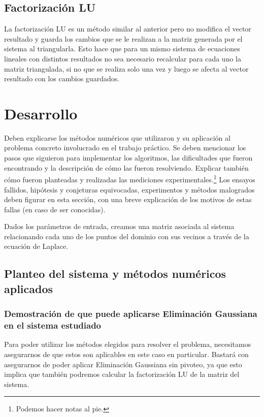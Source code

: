 \documentclass[11pt, a4paper, spanish]{article}
\theoremstyle{plain}
\theoremstyle{remark}
\begin{document}
    \subsection{Factorización LU}
      La factorización LU es un método similar al anterior pero no modifica el vector resultado y guarda los cambios que se le realizan a la matriz generada por el sistema al triangularla. Esto hace que para un mismo sistema de ecuaciones lineales con distintos resultados no sea necesario recalcular para cada uno la matriz triangulada, si  no que se realiza solo una vez y luego se afecta al vector resultado con los cambios guardados.


\section{Desarrollo}

  Deben explicarse los métodos numéricos que utilizaron y su aplicación al problema concreto involucrado en el trabajo práctico. Se deben mencionar los pasos que siguieron para implementar los algoritmos, las dificultades que fueron encontrando y la descripción de cómo las fueron resolviendo. Explicar también cómo fueron planteadas y realizadas las mediciones experimentales.\footnote{Podemos hacer notas al pie.} Los ensayos fallidos, hipótesis y conjeturas equivocadas, experimentos y métodos malogrados deben figurar en esta sección, con una breve explicación de los motivos de estas fallas (en caso de ser conocidas).

  Dados los parámetros de entrada, creamos una matriz asociada al sistema relacionando cada uno de los puntos del dominio con sus vecinos a través de la ecuación de Laplace.


  \subsection{Planteo del sistema y métodos numéricos aplicados}

    \subsubsection*{Demostración de que puede aplicarse Eliminación Gaussiana en el sistema estudiado}

      Para poder utilizar los métodos elegidos para resolver el problema, necesitamos asegurarnos de que estos son aplicables en este caso en particular. Bastará con asegurarnos de poder aplicar Eliminación Gaussiana sin pivoteo, ya que esto implica que también podremos calcular la factorización LU de la matriz del sistema.\cite[p.~403]{burden}
\end{document}
